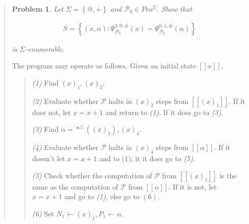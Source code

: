 \documentclass[a4paper, 12pt]{article}
\newtheorem{problem}{Problem}
\newtheorem{problem}{Problem}
\begin{document}
\begin{quote}
\begin{problem}
    Let $\Sigma = \left\{ @, + \right\} $ and $\mathcal{P}_0 \in Pro^{\Sigma}$.
    Show that 

    \begin{align*}
        S = \left\{ ({x}, {\alpha}) : \Psi_{\mathcal{P}_0}^{1, 0, \#}(x)
        = \Psi_{\mathcal{P}_0}^{0, 1, \#}(\alpha)\right\} 
    \end{align*}

    is $\Sigma$-enumerable.
\end{problem}

The program may operate as follows. Given an initial state $[\![ x ]\!]$,

\begin{quote}
    \textit{(1)} Find $(x)_1, (x)_2$. 

    \textit{(2)} Evaluate whether $\mathcal{P}$ halts in $(x)_2$ steps from
    $[\![ (x)_1 ]\!]$. If it does not, let $x = x + 1$ and return to
    \textit{(1)}. If it does go to \textit{(3)}. 

    \textit{(3)} Find $\alpha = *^{\leq} \left( (x)_3 \right), (x)_4 $.  

    \textit{(4)} Evaluate whether $\mathcal{P}$ halts in $(x)_4$ steps from
    $[\![ \alpha ]\!]$. If it doesn't let $x = x+ 1$ and to $\textit{(1)}$; it it does go to
    \textit{(5)}. 

    \textit{(5)} Check whether the computation of $\mathcal{P}$ from $[\![ (x)_1
    ]\!]$ is the same as the computation of $\mathcal{P}$ from $[\![ \alpha
    ]\!]$. If it is not, let $x = x + 1$ and go to \textit{(1)}, else go to
    $(6)$. 

    \textit{(6)} Set $N_1 \leftarrow (x)_1, P_1 \leftarrow  \alpha$.
\end{quote}


\end{quote}
\end{document}
